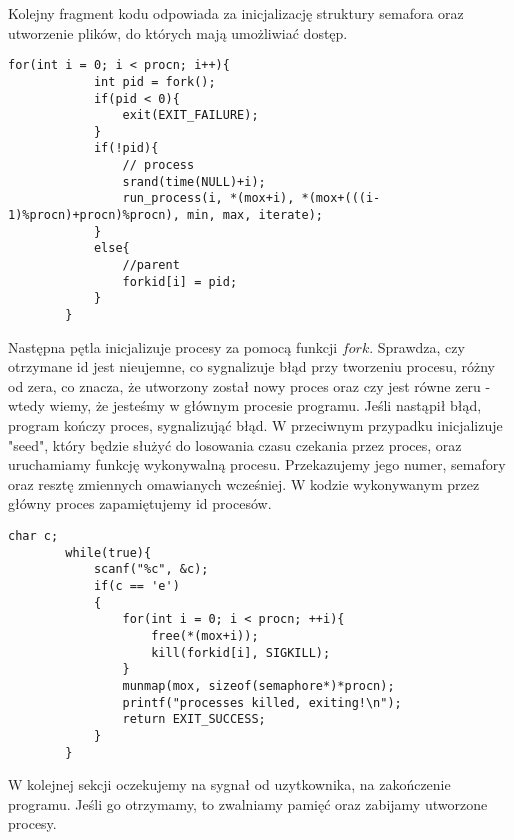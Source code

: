 \documentclass[11pt, wide]{article}
\begin{document}
    Kolejny fragment kodu odpowiada za inicjalizację struktury semafora oraz utworzenie plików, do których mają umożliwiać dostęp.
    \begin{lstlisting}[style=CStyle]
        for(int i = 0; i < procn; i++){
            int pid = fork();
            if(pid < 0){
                exit(EXIT_FAILURE);
            }
            if(!pid){
                // process
                srand(time(NULL)+i);            
                run_process(i, *(mox+i), *(mox+(((i-1)%procn)+procn)%procn), min, max, iterate);
            }
            else{
                //parent
                forkid[i] = pid;
            }
        }\end{lstlisting}
    Następna pętla inicjalizuje procesy za pomocą funkcji $fork$. Sprawdza, czy otrzymane id jest
    nieujemne, co sygnalizuje błąd przy tworzeniu procesu, różny od zera, co znacza, że utworzony został nowy proces oraz czy jest równe zeru - wtedy
    wiemy, że jesteśmy w głównym procesie programu. Jeśli nastąpił błąd, program kończy proces, sygnalizująć błąd.
    W przeciwnym przypadku inicjalizuje "seed", który będzie służyć do losowania czasu czekania przez proces, 
    oraz uruchamiamy funkcję wykonywalną procesu. Przekazujemy jego numer, semafory oraz resztę zmiennych omawianych wcześniej.
    W kodzie wykonywanym przez główny proces zapamiętujemy id procesów.
    \begin{lstlisting}[style=CStyle]
        char c;
        while(true){
            scanf("%c", &c);
            if(c == 'e')
            {
                for(int i = 0; i < procn; ++i){
                    free(*(mox+i));
                    kill(forkid[i], SIGKILL);
                }
                munmap(mox, sizeof(semaphore*)*procn);
                printf("processes killed, exiting!\n");
                return EXIT_SUCCESS;
            }
        }\end{lstlisting}
    W kolejnej sekcji oczekujemy na sygnał od uzytkownika, na zakończenie programu. 
    Jeśli go otrzymamy, to zwalniamy pamięć oraz zabijamy utworzone procesy.
\end{document}
